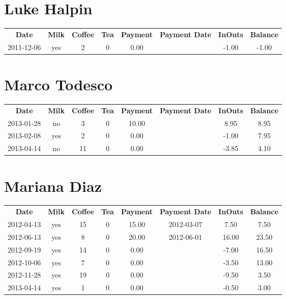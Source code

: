 \section{Luke Halpin}

\begin{center}
\begin{tabular}{cccccccc}
\textbf{Date} & \textbf{Milk} & \textbf{Coffee} & \textbf{Tea} & \textbf{Payment} & \textbf{Payment Date} & \textbf{InOuts} & \textbf{Balance} \\
2011-12-06 & yes & 2 & 0 & 0.00 &  & -1.00 & -1.00
\end{tabular}
\end{center}

\section{Marco Todesco}

\begin{center}
\begin{tabular}{cccccccc}
\textbf{Date} & \textbf{Milk} & \textbf{Coffee} & \textbf{Tea} & \textbf{Payment} & \textbf{Payment Date} & \textbf{InOuts} & \textbf{Balance} \\
2013-01-28 & no &  3 & 0 & 10.00 &  &  8.95 & 8.95\\ 
2013-02-08 & yes &  2 & 0 &  0.00 &  & -1.00 & 7.95\\ 
2013-04-14 & no & 11 & 0 &  0.00 &  & -3.85 & 4.10
\end{tabular}
\end{center}

\section{Mariana Diaz}

\begin{center}
\begin{tabular}{cccccccc}
\textbf{Date} & \textbf{Milk} & \textbf{Coffee} & \textbf{Tea} & \textbf{Payment} & \textbf{Payment Date} & \textbf{InOuts} & \textbf{Balance} \\
2012-04-13 & yes & 15 & 0 & 15.00 & 2012-03-07 &  7.50 &  7.50\\ 
2012-06-13 & yes &  8 & 0 & 20.00 & 2012-06-01 & 16.00 & 23.50\\ 
2012-09-19 & yes & 14 & 0 &  0.00 &  & -7.00 & 16.50\\ 
2012-10-06 & yes &  7 & 0 &  0.00 &  & -3.50 & 13.00\\ 
2012-11-28 & yes & 19 & 0 &  0.00 &  & -9.50 &  3.50\\ 
2013-04-14 & yes &  1 & 0 &  0.00 &  & -0.50 &  3.00
\end{tabular}
\end{center}


